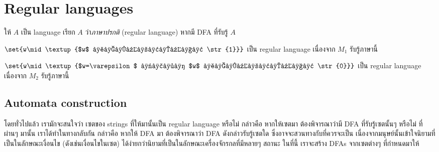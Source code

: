 \section{Regular languages}

\begin{definition}
ให้ $A$ เป็น language \enskip เรียก $A$ ว่า\emph{ภาษาปรกติ} (regular language) หากมี DFA ที่รับรู้ $A$
\end{definition}
%
\begin{example}
$\set{w\mid\textup{$w$ ลงท้ายด้วย \str{1}}}$ เป็น regular language เนื่องจาก $M_1$ รับรู้ภาษานี้
\end{example}
\begin{example}
$\set{w\mid\textup{$w=\varepsilon$ หรือ $w$ ลงท้ายด้วย \str{0}}}$ เป็น regular language เนื่องจาก $M_2$ รับรู้ภาษานี้
\end{example}

\subsection{Automata construction}

โดยทั่วไปแล้ว เรามักจะสนใจว่า เซตของ strings ที่ให้มานั้นเป็น regular language หรือไม่ กล่าวคือ หากให้เซตมา ต้องพิจารณาว่ามี DFA ที่รับรู้เซตนั้นๆ หรือไม่ \enskip ที่ผ่านๆ มานั้น เราได้ทำในทางกลับกัน กล่าวคือ หากให้ DFA มา ต้องพิจารณาว่า DFA ดังกล่าวรับรู้เซตใด ซึ่งอาจจะสวนทางกับที่ควรจะเป็น เนื่องจากมนุษย์นั้นเข้าใจนิยามที่เป็นในลักษณะเงื่อนไข (ดังเช่นเงื่อนไขในเซต) ได้ง่ายกว่านิยามที่เป็นในลักษณะเครื่องจักรกลที่มีหลายๆ สถานะ \enskip ในที่นี้ เราจะสร้าง DFAs จากเซตต่างๆ ที่กำหนดมาให้

